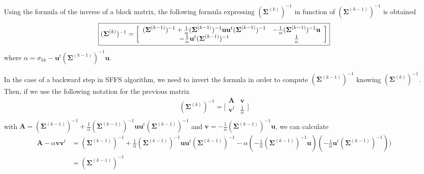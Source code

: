 \documentclass[a4paper,11pt,DIV=16]{scrartcl}
\begin{document}
        Using the formula of the inverse of a block matrix, the following formula expressing $(\boldsymbol{\Sigma}^{(k)})^{-1}$ in function of $(\boldsymbol{\Sigma}^{(k-1)})^{-1}$ is obtained
        \begin{equation}
            \fbox{$
            (\boldsymbol{\Sigma}^{(k)})^{-1} =
            \bigg[\begin{array}{cc}
            (\boldsymbol{\Sigma}^{(k-1)})^{-1} + \frac{1}{\alpha} (\boldsymbol{\Sigma}^{(k-1)})^{-1} \mathbf{u} \mathbf{u}^t (\boldsymbol{\Sigma}^{(k-1)})^{-1} & - \frac{1}{\alpha} (\boldsymbol{\Sigma}^{(k-1)})^{-1} \mathbf{u} \\
            - \frac{1}{\alpha} \mathbf{u}^t (\boldsymbol{\Sigma}^{(k-1)})^{-1}                                                                          & \frac{1}{\alpha}                  \\
            \end{array}\bigg]
            $}
        \end{equation}
        where $ \alpha = \sigma_{kk} - \mathbf{u}^t (\boldsymbol{\Sigma}^{(k-1)})^{-1} \mathbf{u} $.

        In the case of a backward step in SFFS algorithm, we need to invert the formula in order to compute $(\boldsymbol{\Sigma}^{(k-1)})^{-1}$ knowing $(\boldsymbol{\Sigma}^{(k)})^{-1}$. Then, if we use the following notation for the previous matrix
        \begin{equation*}
            (\boldsymbol{\Sigma}^{(k)})^{-1} =
            \bigg[\begin{array}{cc}
            \mathbf{A}   & \mathbf{v} \\
            \mathbf{v}^t & \frac{1}{\alpha} \\
            \end{array}\bigg]
        \end{equation*}
        with $\mathbf{A} = (\boldsymbol{\Sigma}^{(k-1)})^{-1} + \frac{1}{\alpha} (\boldsymbol{\Sigma}^{(k-1)})^{-1} \mathbf{u} \mathbf{u}^t (\boldsymbol{\Sigma}^{(k-1)})^{-1}$ and $\mathbf{v} = - \frac{1}{\alpha} (\boldsymbol{\Sigma}^{(k-1)})^{-1} \mathbf{u}$, we can calculate
        \begin{align*}
            \mathbf{A} - \alpha \mathbf{v} \mathbf{v}^t
            &= (\boldsymbol{\Sigma}^{(k-1)})^{-1} + \frac{1}{\alpha} (\boldsymbol{\Sigma}^{(k-1)})^{-1} \mathbf{u} \mathbf{u}^t (\boldsymbol{\Sigma}^{(k-1)})^{-1} - \alpha (- \frac{1}{\alpha} (\boldsymbol{\Sigma}^{(k-1)})^{-1} \mathbf{u}) (- \frac{1}{\alpha} \mathbf{u}^t (\boldsymbol{\Sigma}^{(k-1)})^{-1})) \\
            &= (\boldsymbol{\Sigma}^{(k-1)})^{-1}
        \end{align*}
\end{document}
